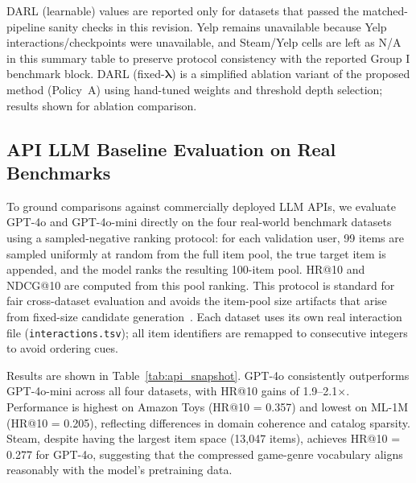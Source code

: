 \documentclass[lettersize,journal]{IEEEtran}
\newcommand{\lambdavec}{\boldsymbol{\lambda}}
\begin{document}
\begin{table}[t]
\footnotesize{DARL (learnable) values are reported only for datasets that passed
the matched-pipeline sanity checks in this revision.
Yelp remains unavailable because Yelp interactions/checkpoints were unavailable,
and Steam/Yelp cells are left as N/A in this summary table to preserve
protocol consistency with the reported Group I benchmark block.
DARL (fixed-$\lambdavec$) is a simplified ablation variant of the
proposed method (Policy~A) using hand-tuned weights and threshold
depth selection; results shown for ablation comparison.}
\end{table}

\subsection{API LLM Baseline Evaluation on Real Benchmarks}

To ground comparisons against commercially deployed LLM APIs,
we evaluate GPT-4o and GPT-4o-mini directly on the four real-world
benchmark datasets using a sampled-negative ranking protocol:
for each validation user, 99 items are sampled uniformly at random
from the full item pool, the true target item is appended, and the
model ranks the resulting 100-item pool.
HR@10 and NDCG@10 are computed from this pool ranking.
This protocol is standard for fair cross-dataset evaluation and
avoids the item-pool size artifacts that arise from fixed-size
candidate generation~\cite{krichene2020sampled}.
Each dataset uses its own real interaction file
(\texttt{interactions.tsv}); all item identifiers are remapped
to consecutive integers to avoid ordering cues.

Results are shown in Table~\ref{tab:api_snapshot}.
GPT-4o consistently outperforms GPT-4o-mini across all four
datasets, with HR@10 gains of 1.9--2.1$\times$.
Performance is highest on Amazon Toys (HR@10 = 0.357) and
lowest on ML-1M (HR@10 = 0.205), reflecting differences in
domain coherence and catalog sparsity.
Steam, despite having the largest item space (13{,}047 items),
achieves HR@10 = 0.277 for GPT-4o, suggesting that the
compressed game-genre vocabulary aligns reasonably with the
model's pretraining data.
\end{document}
